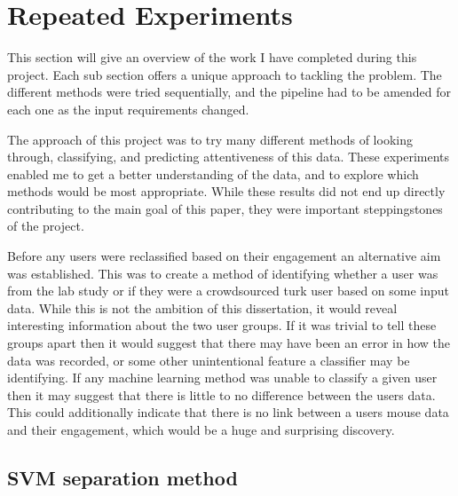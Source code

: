 \documentclass{article}
\begin{document}
\section{Repeated Experiments}


This section will give an overview of the work I have completed during this project.
Each sub section offers a unique approach to tackling the problem.
The different methods were tried sequentially, and the pipeline had to be amended for each one as the input requirements changed.

The approach of this project was to try many different methods of looking through, classifying, and predicting attentiveness of this data.
These experiments enabled me to get a better understanding of the data, and to explore which methods would be most appropriate.
While these results did not end up directly contributing to the main goal of this paper, they were important steppingstones of the project.

Before any users were reclassified based on their engagement an alternative aim was established.
This was to create a method of identifying whether a user was from the lab study or if they were a crowdsourced turk user based on some input data.
While this is not the ambition of this dissertation, it would reveal interesting information about the two user groups.
If it was trivial to tell these groups apart then it would suggest that there may have been an error in how the data was recorded, or some other unintentional feature a classifier may be identifying.
If any machine learning method was unable to classify a given user then it may suggest that there is little to no difference between the users data.
This could additionally indicate that there is no link between a users mouse data and their engagement, which would be a huge and surprising discovery. 


\subsection{SVM separation method}
\end{document}
